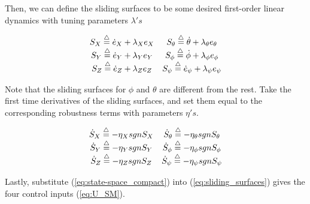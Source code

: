 \documentclass[journal,11pt,onecolumn,draftclsnofoot,]{IEEEtran}
\begin{document}
Then, we can define the sliding surfaces to be some desired first-order linear dynamics with tuning parameters $\lambda's$ 

\begingroup\makeatletter{}\check@mathfonts
\begin{equation*}
\begin{split}
\begin{matrix}
S_X \buildrel\triangle\over = \dot{e}_X + \lambda_X e_X & S_\theta \buildrel\triangle\over = \dot{\theta} + \lambda_\theta e_\theta \\
S_Y \buildrel\triangle\over = \dot{e}_Y + \lambda_Y e_Y & S_\phi \buildrel\triangle\over = \dot{\phi} + \lambda_\phi e_\phi \\
S_Z \buildrel\triangle\over = \dot{e}_Z + \lambda_Z e_Z & S_\psi \buildrel\triangle\over = \dot{e}_\psi + \lambda_\psi e_\psi \\
\end{matrix}
\end{split}
\end{equation*}
\endgroup

Note that the sliding surfaces for $\phi$ and $\theta$ are different from the rest. Take the first time derivatives of the sliding surfaces, and set them equal to the corresponding robustness terms with parameters $\eta's$.

\begingroup\makeatletter{}\check@mathfonts
\begin{equation}
\label{eq:sliding_surfaces}
\begin{split}
\begin{matrix}
\dot{S}_X \buildrel\triangle\over =-\eta_X sgn S_X & \dot{S}_\theta \buildrel\triangle\over = -\eta_\theta sgn S_\theta \\
\dot{S}_Y \buildrel\triangle\over =-\eta_Y sgn S_Y & \dot{S}_\phi \buildrel\triangle\over = -\eta_\phi sgn S_\phi \\
\dot{S}_Z \buildrel\triangle\over =-\eta_Z sgn S_Z & \dot{S}_\psi \buildrel\triangle\over =-\eta_\psi sgn S_\psi \\
\end{matrix}
\end{split}
\end{equation}
\endgroup

Lastly, substitute (\ref{eq:state-space_compact}) into (\ref{eq:sliding_surfaces}) gives the four control inputs (\ref{eq:U_SM}).
\end{document}

